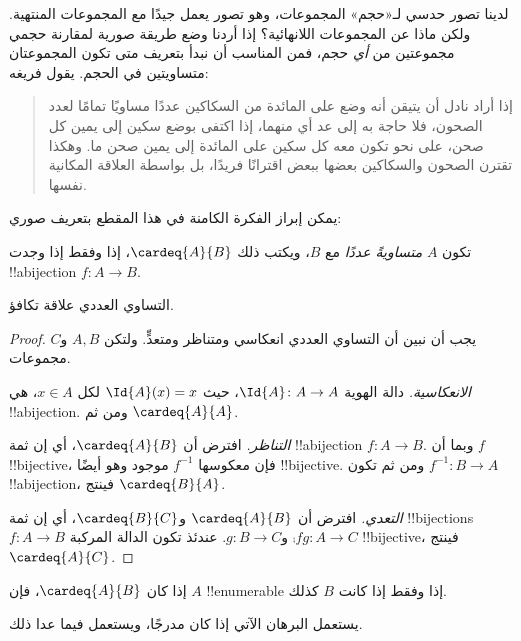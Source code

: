 \documentclass[../../../include/open-logic-section]{subfiles}
\begin{document}


لدينا تصور حدسي لـ«حجم» المجموعات، وهو تصور يعمل جيدًا مع المجموعات
المنتهية. ولكن ماذا عن المجموعات اللانهائية؟ إذا أردنا وضع طريقة صورية
لمقارنة حجمي مجموعتين من \emph{أي} حجم، فمن المناسب أن نبدأ بتعريف
متى تكون المجموعتان متساويتين في الحجم. يقول فريغه:
\begin{quote}
  إذا أراد نادل أن يتيقن أنه وضع على المائدة من السكاكين عددًا مساويًا
  تمامًا لعدد الصحون، فلا حاجة به إلى عد أي منهما، إذا اكتفى بوضع سكين
  إلى يمين كل صحن، على نحو تكون معه كل سكين على المائدة إلى يمين صحن
  ما. وهكذا تقترن الصحون والسكاكين بعضها ببعض اقترانًا فريدًا، بل بواسطة
  العلاقة المكانية نفسها. \citep[\S70]{Frege1884}
\end{quote}
يمكن إبراز الفكرة الكامنة في هذا المقطع بتعريف صوري:

\begin{defn}
  تكون $A$ \emph{متساويةً عددًا} مع $B$، ويكتب ذلك $\cardeq{A}{B}$، إذا
  وفقط إذا وجدت !!a{bijection} $f \colon A \to B$.
\end{defn}

\begin{prop}
التساوي العددي علاقة تكافؤ.
\end{prop}

\begin{proof}
يجب أن نبين أن التساوي العددي انعكاسي ومتناظر ومتعدٍّ. ولتكن $A, B$
و$C$ مجموعات.

\emph{الانعكاسية.} دالة الهوية $\Id{A} \colon A \to A$، حيث
$\Id{A} (x) = x$ لكل $x \in A$، هي !!a{bijection}. ومن ثم
$\cardeq{A}{A}$.

\emph{التناظر.} افترض أن $\cardeq{A}{B}$، أي إن ثمة
!!a{bijection} $f\colon A \to B$. وبما أن $f$ !!{bijective}، فإن
معكوسها $f^{-1}$ موجود وهو أيضًا !!{bijective}. ومن ثم تكون
$f^{-1}\colon B \to A$ !!a{bijection}، فينتج $\cardeq{B}{A}$.

\emph{التعدي.} افترض أن $\cardeq{A}{B}$ و$\cardeq{B}{C}$، أي إن ثمة
!!{bijection}s $f\colon A \to B$ و$g\colon B \to
C$. عندئذ تكون الدالة المركبة $\comp{f}{g}\colon A \to C$ !!{bijective}،
فينتج $\cardeq{A}{C}$.
\end{proof}

\begin{prop}
إذا كان $\cardeq{A}{B}$، فإن $A$ !!{enumerable} إذا
وفقط إذا كانت $B$ كذلك.
\end{prop}

\begin{editorial}
يستعمل البرهان الآتي  إذا كان
 مدرجًا، ويستعمل 
فيما عدا ذلك.
\end{editorial}
\end{document}
